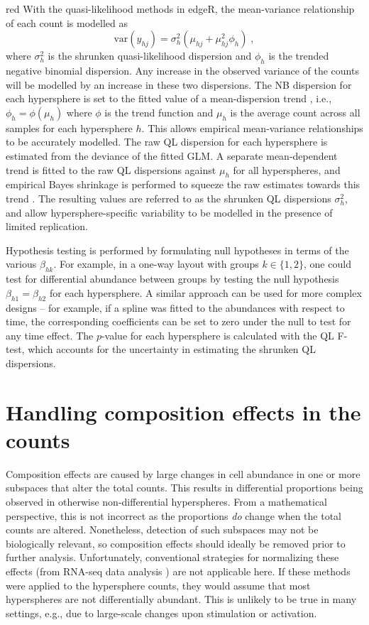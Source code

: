 \documentclass{article}
\begin{document}
\begin{color}{red}
With the quasi-likelihood methods in edgeR, the mean-variance relationship of each count is modelled as
\[
    \mbox{var}(y_{hj}) = \sigma^2_{h} (\mu_{hj} + \mu_{hj}^2 \phi_h) \;,
\]
where $\sigma^2_h$ is the shrunken quasi-likelihood dispersion and $\phi_h$ is the trended negative binomial dispersion.
Any increase in the observed variance of the counts will be modelled by an increase in these two dispersions.
The NB dispersion for each hypersphere is set to the fitted value of a mean-dispersion trend \cite{mccarthy2012differential}, i.e., $\phi_h = \phi(\mu_h)$ where $\phi$ is the trend function and $\mu_h$ is the average count across all samples for each hypersphere $h$.
This allows empirical mean-variance relationships to be accurately modelled.
The raw QL dispersion for each hypersphere is estimated from the deviance of the fitted GLM.
A separate mean-dependent trend is fitted to the raw QL dispersions against $\mu_h$ for all hyperspheres, and empirical Bayes shrinkage is performed to squeeze the raw estimates towards this trend \cite{lund2012detecting}.
The resulting values are referred to as the shrunken QL dispersions $\sigma^2_h$, and allow hypersphere-specific variability to be modelled in the presence of limited replication.

Hypothesis testing is performed by formulating null hypotheses in terms of the various $\beta_{hk}$.
For example, in a one-way layout with groups $k\in\{1,2\}$, one could test for differential abundance between groups by testing the null hypothesis $\beta_{h1}=\beta_{h2}$ for each hypersphere.
A similar approach can be used for more complex designs -- for example, if a spline was fitted to the abundances with respect to time, the corresponding coefficients can be set to zero under the null to test for any time effect.
The $p$-value for each hypersphere is calculated with the QL F-test, which accounts for the uncertainty in estimating the shrunken QL dispersions. 
\end{color}

\section{Handling composition effects in the counts}
Composition effects are caused by large changes in cell abundance in one or more subspaces that alter the total counts.
This results in differential proportions being observed in otherwise non-differential hyperspheres.
From a mathematical perspective, this is not incorrect as the proportions \textit{do} change when the total counts are altered.
Nonetheless, detection of such subspaces may not be biologically relevant, so composition effects should ideally be removed prior to further analysis.
Unfortunately, conventional strategies for normalizing these effects (from RNA-seq data analysis \cite{robinson2010scaling}) are not applicable here.
If these methods were applied to the hypersphere counts, they would assume that most hyperspheres are not differentially abundant.
This is unlikely to be true in many settings, e.g., due to large-scale changes upon stimulation or activation.
\end{document}
